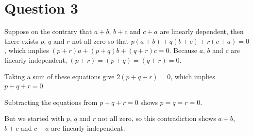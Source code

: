 \section*{Question 3}
Suppose on the contrary that $ a + b $, $ b + c $ and $ c + a $ are linearly dependent, then there exists $ p $, $ q $ and $ r $ not all zero so that $ p(a+b) + q(b + c) + r(c + a) = 0 $, which implies $ (p + r)a + (p + q)b + (q + r)c = 0 $. Because $ a $, $ b $ and $ c $ are linearly independent, $ (p+r) = (p+q) = (q+r) = 0 $. 

Taking a sum of these equations give $ 2(p + q + r) = 0 $, which implies $ p + q + r = 0 $.

Subtracting the equations from $ p + q + r = 0 $ shows $ p = q = r = 0 $.

But we started with $ p $, $ q $ and $ r $ not all zero, so this contradiction shows $ a + b $, $ b + c $ and $ c + a $ are linearly independent.